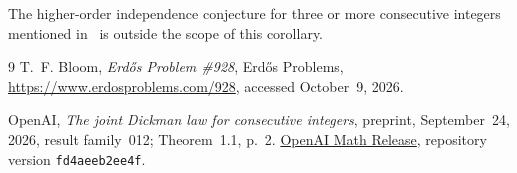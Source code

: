 \documentclass[11pt,a4paper]{amsart}
\begin{document}
The higher-order independence conjecture for three or more consecutive
integers mentioned in~\cite{Bloom928} is outside the scope of this corollary.

\begin{thebibliography}{9}
T.~F. Bloom, \emph{Erd\H{o}s Problem \#928}, Erd\H{o}s Problems,
\url{https://www.erdosproblems.com/928}, accessed October~9, 2026.

OpenAI, \emph{The joint Dickman law for consecutive integers},
preprint, September~24, 2026, result family~012; Theorem~1.1, p.~2.
\href{https://github.com/openai/math/blob/fd4aeeb2ee4fc729c18d98444fed42fd0529eeeb/preprints/The-joint-Dickman-law-for-consecutive-integers-September-24-2026/paper.pdf}{OpenAI Math Release},
repository version \texttt{fd4aeeb2ee4f}.
\end{thebibliography}
\end{document}
